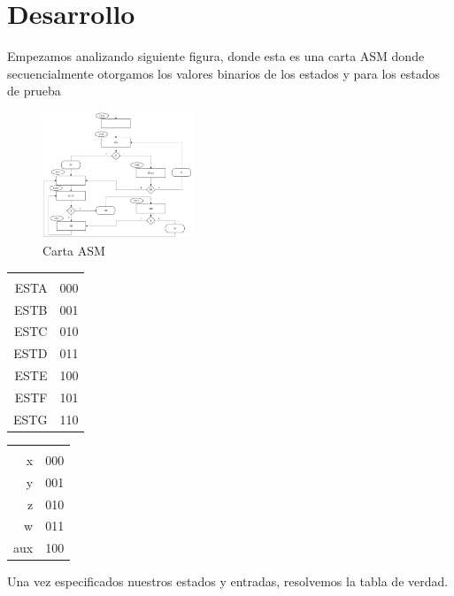 \documentclass[table]{scrartcl}
\begin{document}
\section{Desarrollo}
\label{sec:orgac7043c}
Empezamos analizando siguiente figura, donde esta es una carta ASM
donde secuencialmente otorgamos los valores binarios de los estados y para
los estados de prueba
\begin{figure}[htbp]
  \centering
  \includegraphics[width=0.4\textwidth]{./img/2.png}
  \caption{\label{fig:2}Carta ASM}
\end{figure}
\begin{center}
    \label{tab:1}
  \begin{tabular}{rl}
    \multicolumn{2}{c}{\cellcolor[HTML]{EA4335}{\color[HTML]{FFFFFF} \textbf{Entradas}}} \\
    ESTA & 000 \\
    ESTB & 001 \\
    ESTC & 010 \\
    ESTD & 011 \\
    ESTE & 100 \\
    ESTF & 101 \\
    ESTG & 110
\end{tabular}
\end{center}
\begin{center}
  \label{tab:2}
  \begin{tabular}{rl}
    \multicolumn{2}{c}{\cellcolor[HTML]{EA4335}{\color[HTML]{FFFFFF} \textbf{Prueba}}} \\
    x & 000 \\
    y & 001 \\
    z & 010 \\
    w & 011 \\
    aux & 100
  \end{tabular}
\end{center}
Una vez especificados nuestros estados y entradas, resolvemos la tabla de
verdad.
\begin{center}
  \label{tab:3}
  \scriptsize
  
\end{center}
\end{document}
